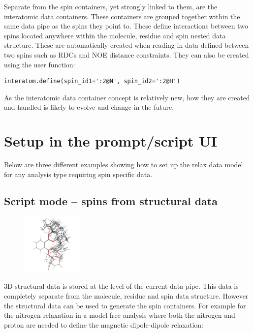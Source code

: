 Separate from the spin containers, yet strongly linked to them, are the interatomic data containers.  These containers are grouped together within the same data pipe as the spins they point to.  These define interactions between two spins located anywhere within the molecule, residue and spin nested data structure.  These are automatically created when reading in data defined between two spins such as RDCs and NOE distance constraints.  They can also be created using the  user function:

\begin{lstlisting}
interatom.define(spin_id1=':2@N', spin_id2=':2@H')
\end{lstlisting}

As the interatomic data container concept is relatively new, how they are created and handled is likely to evolve and change in the future.




\section{Setup in the prompt/script UI}

Below are three different examples showing how to set up the relax data model for any analysis type requiring spin specific data.



\subsection{Script mode -- spins from structural data} \label{sect: script - structural data}

\begin{figure}[h]
\includegraphics[width=3cm, bb=0 0 1701 1701]{graphics/misc/n_state_model/phthalic_acid_ens_600x600}
\end{figure}

3D structural data is stored at the level of the current data pipe.  This data is completely separate from the molecule, residue and spin data structure.  However the structural data can be used to generate the spin containers.  For example for the nitrogen relaxation in a model-free analysis where both the nitrogen and proton are needed to define the magnetic dipole-dipole relaxation:

